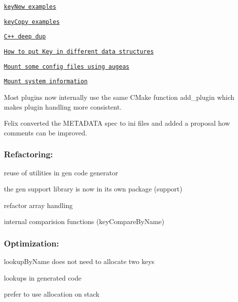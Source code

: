 \begin{DoxyItemize}
\item \href{https://github.com/ElektraInitiative/libelektra/tree/master/examples/keyNew.c}{\tt key\+New examples}
\item \href{https://github.com/ElektraInitiative/libelektra/tree/master/examples/keyCopy.c}{\tt key\+Copy examples}
\item \href{https://github.com/ElektraInitiative/libelektra/tree/master/src/bindings/cpp/examples/cpp_example_dup.cpp}{\tt C++ deep dup}
\item \href{https://github.com/ElektraInitiative/libelektra/tree/master/src/bindings/cpp/examples/cpp_example_ordering.cpp}{\tt How to put Key in different data structures}
\item \href{https://github.com/ElektraInitiative/libelektra/tree/master/scripts/mount-augeas}{\tt Mount some config files using augeas}
\item \href{https://github.com/ElektraInitiative/libelektra/tree/master/scripts/mount-info}{\tt Mount system information}
\end{DoxyItemize}

Most plugins now internally use the same C\+Make function {\ttfamily add\+\_\+plugin} which makes plugin handling more consistent.

Felix converted the M\+E\+T\+A\+D\+A\+T\+A spec to ini files and added a proposal how comments can be improved.

\subsubsection*{Refactoring\+:}


\begin{DoxyItemize}
\item reuse of utilities in gen code generator
\item the gen support library is now in its own package ({\ttfamily support})
\item refactor array handling
\item internal comparision functions (key\+Compare\+By\+Name)
\end{DoxyItemize}

\subsubsection*{Optimization\+:}


\begin{DoxyItemize}
\item lookup\+By\+Name does not need to allocate two keys
\item lookups in generated code
\item prefer to use allocation on stack
\end{DoxyItemize}

